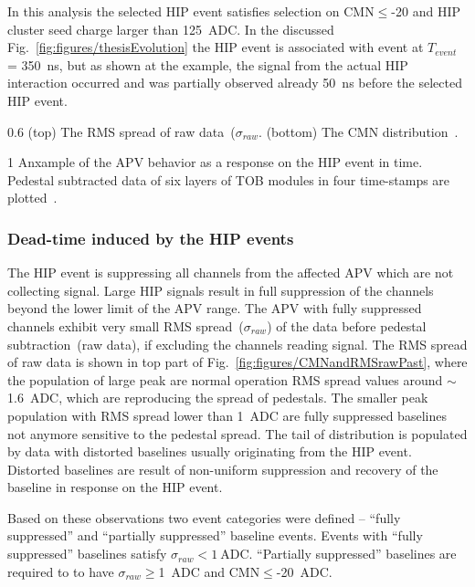 In this analysis the selected HIP event satisfies selection on CMN$\leq$-20 and HIP cluster seed charge larger than 125~ADC.  In the discussed Fig.~\ref{fig:figures/thesisEvolution} the HIP event is associated with event at $T_{event}$ = 350~ns, but as shown at the example, the signal from the actual HIP interaction occurred and was partially observed already 50~ns before the selected HIP event.

                 {0.6}       %
                 {(top) The RMS spread of raw data~($\sigma_{raw}$. (bottom) The CMN distribution~\cite{Bainbridge:2004jc}.} %


                 {1}       %
                 {Anxample of the APV behavior as a response on the HIP event in time. Pedestal subtracted data of six layers of TOB modules in four time-stamps are plotted~\cite{Bainbridge:2004jc}.} %



\subsubsection{Dead-time induced by the HIP events}

The HIP event is suppressing all channels from the affected APV which are not collecting signal. Large HIP signals result in full suppression of the channels beyond the lower limit of the APV range. The APV with fully suppressed channels exhibit very small RMS spread~($\sigma_{raw}$) of the data before pedestal subtraction~(raw data), if excluding the channels reading signal. The RMS spread of raw data is shown in top part of Fig.~\ref{fig:figures/CMNandRMSrawPast}, where the population of large peak are normal operation RMS spread values around $\sim$1.6~ADC, which are reproducing the spread of pedestals. The smaller peak population with RMS spread lower than 1~ADC are fully suppressed baselines not anymore sensitive to the pedestal spread. The tail of distribution is populated by data with distorted baselines usually originating from the HIP event. Distorted baselines are result of non-uniform suppression and recovery of the baseline in response on the HIP event.

Based on these observations two event categories were defined -- ``fully suppressed'' and ``partially suppressed'' baseline events. Events with ``fully suppressed'' baselines satisfy $\sigma_{raw}< 1~\mathrm{ADC}$. ``Partially suppressed'' baselines are required to to have $\sigma_{raw}\geq$1~ADC and CMN$\leq$-20~ADC.


